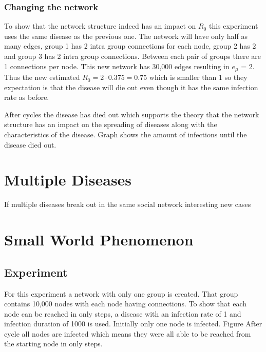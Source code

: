 \subsubsection{Changing the network}
To show that the network structure indeed has an impact on $R_0$ this experiment
uses the same disease as the previous one. The network will have only half as many
edges, group 1 has 2 intra group connections for each node, group 2 has 2 and
group 3 has 2 intra group connections. Between each pair of groups there are
1 connections per node. This new network has 30,000 edges resulting in $e_\mu$ = 2.
Thus the new estimated $R_0=2\cdot0.375=0.75$ which is smaller than 1 so they
expectation is that the disease will die out even though it has the same infection 
rate as before.

After %
cycles the disease has died out which supports the theory that the network structure
has an impact on the spreading of diseases along with the characteristics of the disease.
Graph %
shows the amount of infections until the disease died out.

\section{Multiple Diseases}
If multiple diseases break out in the same social network interesting new
cases %

\section{Small World Phenomenon}

\subsection{Experiment}
For this experiment a network with only one group is created. That group
contains 10,000 nodes with each node having %
connections. To show that each node can be reached in only %
steps, a disease with an infection rate of 1 and infection duration of
1000 is used. Initially only one
node is infected. Figure %
After cycle %
all nodes are infected which means they were all able to be reached from the 
starting node in only %
steps.


